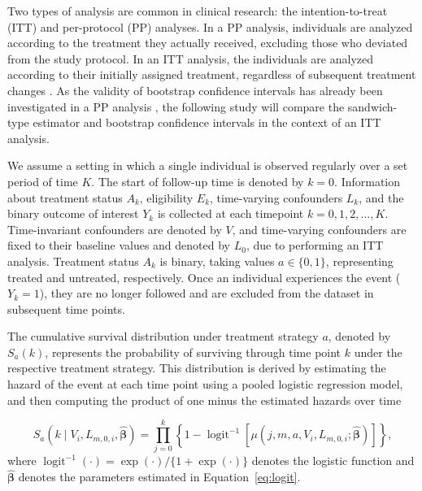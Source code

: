 \documentclass[pdflatex,sn-vancouver-ay]{sn-jnl}%
\theoremstyle{thmstyleone}%
\theoremstyle{thmstyletwo}%
\theoremstyle{thmstylethree}%
\begin{document}
Two types of analysis are common in clinical research: the intention-to-treat (ITT) and per-protocol (PP) analyses. In a PP analysis, individuals are analyzed according to the treatment they actually received, excluding those who deviated from the study protocol. In an ITT analysis, the individuals are analyzed according to their initially assigned treatment, regardless of subsequent treatment changes  \citep{tripepiIntentionTreatProtocol2020}.
As the validity of bootstrap confidence intervals has already been investigated in a PP analysis \citep{limozinInferenceProceduresSequential2024}, the following study will compare the sandwich-type estimator and bootstrap confidence intervals in the context of an ITT analysis.

We assume a setting in which a single individual is observed regularly over a set period of time $K$. The start of follow-up time is denoted by $k = 0$. Information about treatment status $A_k$, eligibility $E_k$, time-varying confounders $L_k$, and the binary outcome of interest $Y_k$ is collected at each timepoint $k = 0, 1, 2, \dots, K$. Time-invariant confounders are denoted by $V$, and time-varying confounders are fixed to their baseline values and denoted by $L_0$, due to performing an ITT analysis. Treatment status $A_k$ is binary, taking values $a \in \{0, 1\}$, representing treated and untreated, respectively. Once an individual experiences the event ($Y_k = 1$), they are no longer followed and are excluded from the dataset in subsequent time points.

The cumulative survival distribution under treatment strategy $a$, denoted by $S_a(k)$, represents the probability of surviving through time point $k$ under the respective treatment strategy. This distribution is derived by estimating the hazard of the event at each time point using a pooled logistic regression model, and then computing the product of one minus the estimated hazards over time

\begin{equation}
    \label{eq:cumsurv}
    S_a(k \mid V_i, L_{m,0,i}, \hat{\boldsymbol{\beta}}) = \prod_{j=0}^k\left\{1-\operatorname{logit}^{-1}\left[\mu\left(j, m, a, V_i, L_{m, 0, i} ; \hat{\boldsymbol{\beta}}\right)\right]\right\} \text{,}
\end{equation}
where $\operatorname{logit}^{-1}(\cdot)=\exp (\cdot) /\{1+\exp (\cdot)\}$ denotes the logistic function and $\hat{\boldsymbol{\beta}}$ denotes the parameters estimated in Equation~\ref{eq:logit}.
\end{document}
